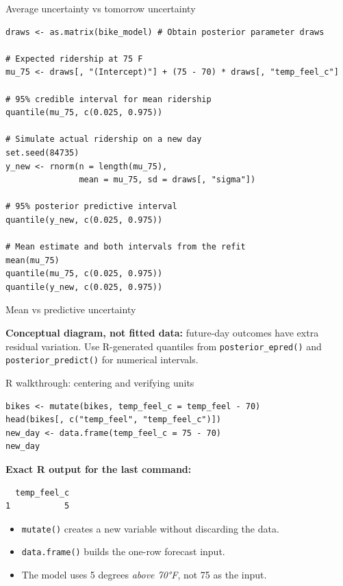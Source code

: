 \documentclass[aspectratio=43,11pt]{beamer}
\begin{document}
\begin{frame}[fragile]{Average uncertainty vs tomorrow uncertainty}
\footnotesize
\begin{verbatim}
draws <- as.matrix(bike_model) # Obtain posterior parameter draws

# Expected ridership at 75 F
mu_75 <- draws[, "(Intercept)"] + (75 - 70) * draws[, "temp_feel_c"]

# 95% credible interval for mean ridership
quantile(mu_75, c(0.025, 0.975))

# Simulate actual ridership on a new day
set.seed(84735)
y_new <- rnorm(n = length(mu_75),
               mean = mu_75, sd = draws[, "sigma"])

# 95% posterior predictive interval
quantile(y_new, c(0.025, 0.975))

# Mean estimate and both intervals from the refit
mean(mu_75)
quantile(mu_75, c(0.025, 0.975))
quantile(y_new, c(0.025, 0.975))
\end{verbatim}
\end{frame}

\begin{frame}{Mean vs predictive uncertainty}
\centering
{}
\par\medskip
\small\textbf{Conceptual diagram, not fitted data:} future-day outcomes have
extra residual variation. Use R-generated quantiles from
\texttt{posterior\_epred()} and \texttt{posterior\_predict()} for numerical intervals.
\end{frame}


\begin{frame}[fragile]{R walkthrough: centering and verifying units}
\small
\begin{verbatim}
bikes <- mutate(bikes, temp_feel_c = temp_feel - 70)
head(bikes[, c("temp_feel", "temp_feel_c")])
new_day <- data.frame(temp_feel_c = 75 - 70)
new_day
\end{verbatim}
\medskip
\textbf{Exact R output for the last command:}
\begin{verbatim}
  temp_feel_c
1           5
\end{verbatim}
\begin{itemize}
\item \texttt{mutate()} creates a new variable without discarding the data.
\item \texttt{data.frame()} builds the one-row forecast input.
\item The model uses 5 degrees \emph{above 70°F}, not 75 as the input.
\end{itemize}
\end{frame}
\end{document}

